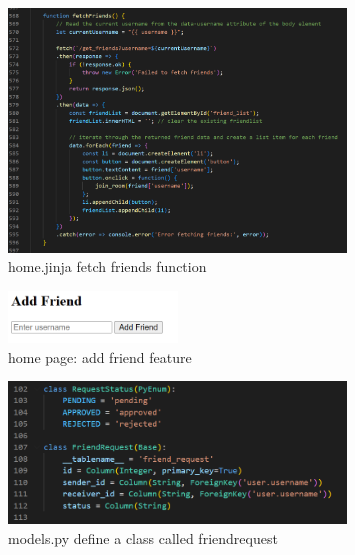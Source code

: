 \documentclass[12pt]{article}
\begin{document}
        \begin{figure}[H]
                \centering
                \includegraphics[width=0.8\textwidth]{zzrgraphs/home_fetchFriends.png}
                \caption{home.jinja fetch friends function}
                \label{fetchfriends}
            \end{figure}

        \begin{figure}[H]
                \centering
                \includegraphics[width=0.4\textwidth]{zzrgraphs/enter_username.png}
                \caption{home page: add friend feature}
                \label{enterusername}
            \end{figure}

        \begin{figure}[H]
                \centering
                \includegraphics[width=0.8\textwidth]{zzrgraphs/models_friendrequest.png}
                \caption{models.py define a class called friendrequest}
                \label{friendrequestClass}
            \end{figure}
\end{document}
